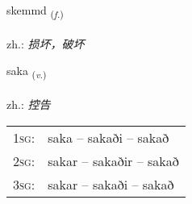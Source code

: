 \documentclass[frontgrid, backgrid]{flacards}\usepackage[]{graphicx}\usepackage[]{xcolor}
\begin{document}
\renewcommand{\flhead}{\vskip5pt \fboxsep=0pt {\small\bfseries\footnotesize Nafnorð | 名词}}
\renewcommand{\fcfoot}{\vskip5pt \fboxsep=0pt \hspace{2pt}{\small\bfseries\footnotesize 3K}}

\renewcommand{\blhead}{\vskip5pt {\small\bfseries\footnotesize Nafnorð | 名词 }}
\renewcommand{\bcfoot}{\vskip5pt \hspace{2pt}{\small\bfseries\footnotesize 3K}}


{skemmd \small{\textsubscript{(\textit{f.})}} \\[1ex] %
\textphonetic{[scɛmt]} \\
zh.: \emph{损坏，破坏} \\  [2ex]
\renewcommand*{\arraystretch}{0.8}
}

\renewcommand{\flhead}{\vskip5pt \fboxsep=0pt {\small\bfseries\footnotesize Sagnorð | 动词}}
\renewcommand{\fcfoot}{\vskip5pt \fboxsep=0pt \hspace{2pt}{\small\bfseries\footnotesize 3K}}

\renewcommand{\blhead}{\vskip5pt {\small\bfseries\footnotesize Sagnorð | 动词 }}
\renewcommand{\bcfoot}{\vskip5pt \hspace{2pt}{\small\bfseries\footnotesize 3K}}


{saka \small{\textsubscript{(\textit{v.})}} \\[1ex] %
\textphonetic{[saːka]} \\
zh.: \emph{控告} \\  [2ex]
\renewcommand*{\arraystretch}{0.8}
\begin{tabular}{p{1cm}l}
\textsc{1sg}: & saka -- sakaði -- sakað \\ 
\textsc{2sg}: & sakar -- sakaðir -- sakað \\ 
\textsc{3sg}: & sakar -- sakaði -- sakað \\ 
\end{tabular}
}
\end{document}
